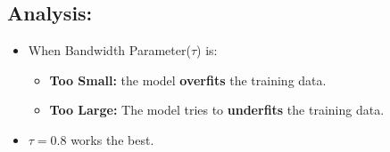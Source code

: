 \documentclass[a4 paper]{article}
\begin{document}
\vspace*{-0.82cm}
\begin{figure}[H]
	\centering
    \begin{floatrow}
	\hspace*{-0.4in}
    \end{floatrow}
\end{figure}

\subsection*{Analysis:}
	
\begin{itemize}
	\item When Bandwidth Parameter($\tau$) is:
	\begin{itemize}
	\item \textbf{Too Small:} the model \textbf{overfits} the training data.
	\item \textbf{Too Large:} The model tries to \textbf{underfits} the training data.
	\end{itemize}
	\item $\tau = 0.8$ works the best.
\end{itemize}
\end{document}

